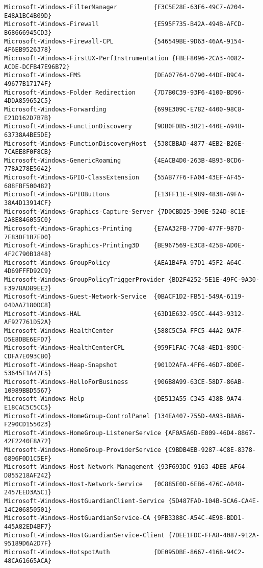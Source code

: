 \documentclass{report}
\begin{document}
\begin{lstlisting}[breaklines=true,basicstyle=\tiny]
Microsoft-Windows-FilterManager          {F3C5E28E-63F6-49C7-A204-E48A1BC4B09D}
Microsoft-Windows-Firewall               {E595F735-B42A-494B-AFCD-B68666945CD3}
Microsoft-Windows-Firewall-CPL           {546549BE-9D63-46AA-9154-4F6EB9526378}
Microsoft-Windows-FirstUX-PerfInstrumentation {FBEF8096-2CA3-4082-ACDE-DCFB47E96B72}
Microsoft-Windows-FMS                    {DEA07764-0790-44DE-B9C4-49677B17174F}
Microsoft-Windows-Folder Redirection     {7D7B0C39-93F6-4100-BD96-4DDA859652C5}
Microsoft-Windows-Forwarding             {699E309C-E782-4400-98C8-E21D162D7B7B}
Microsoft-Windows-FunctionDiscovery      {9DB0FDB5-3B21-440E-A94B-63738A4BE5DE}
Microsoft-Windows-FunctionDiscoveryHost  {538CBBAD-4877-4EB2-B26E-7CAEE8F0F8CB}
Microsoft-Windows-GenericRoaming         {4EACB4D0-263B-4B93-8CD6-778A278E5642}
Microsoft-Windows-GPIO-ClassExtension    {55AB77F6-FA04-43EF-AF45-688FBF500482}
Microsoft-Windows-GPIOButtons            {E13FF11E-E989-4838-A9FA-38A4D13914CF}
Microsoft-Windows-Graphics-Capture-Server {7D0CBD25-390E-524D-8C1E-2A8E846055C0}
Microsoft-Windows-Graphics-Printing      {E7AA32FB-77D0-477F-987D-7E83DF1B7ED0}
Microsoft-Windows-Graphics-Printing3D    {BE967569-E3C8-425B-AD0E-4F2C790B1848}
Microsoft-Windows-GroupPolicy            {AEA1B4FA-97D1-45F2-A64C-4D69FFFD92C9}
Microsoft-Windows-GroupPolicyTriggerProvider {BD2F4252-5E1E-49FC-9A30-F3978AD89EE2}
Microsoft-Windows-Guest-Network-Service  {0BACF1D2-FB51-549A-6119-04DAA7180DC8}
Microsoft-Windows-HAL                    {63D1E632-95CC-4443-9312-AF927761D52A}
Microsoft-Windows-HealthCenter           {588C5C5A-FFC5-44A2-9A7F-D5E8DBE6EFD7}
Microsoft-Windows-HealthCenterCPL        {959F1FAC-7CA8-4ED1-89DC-CDFA7E093CB0}
Microsoft-Windows-Heap-Snapshot          {901D2AFA-4FF6-46D7-8D0E-53645E1A47F5}
Microsoft-Windows-HelloForBusiness       {906B8A99-63CE-58D7-86AB-10989BBD5567}
Microsoft-Windows-Help                   {DE513A55-C345-438B-9A74-E18CAC5C5CC5}
Microsoft-Windows-HomeGroup-ControlPanel {134EA407-755D-4A93-B8A6-F290CD155023}
Microsoft-Windows-HomeGroup-ListenerService {AF0A5A6D-E009-46D4-8867-42F2240F8A72}
Microsoft-Windows-HomeGroup-ProviderService {C9BDB4EB-9287-4C8E-8378-6896F0D1C5EF}
Microsoft-Windows-Host-Network-Management {93F693DC-9163-4DEE-AF64-D855218AF242}
Microsoft-Windows-Host-Network-Service   {0C885E0D-6EB6-476C-A048-2457EED3A5C1}
Microsoft-Windows-HostGuardianClient-Service {5D487FAD-104B-5CA6-CA4E-14C206850501}
Microsoft-Windows-HostGuardianService-CA {9FB3388C-A54C-4E98-BDD1-445A82ED4BF7}
Microsoft-Windows-HostGuardianService-Client {7DEE1FDC-FFA8-4087-912A-95189D6A2D7F}
Microsoft-Windows-HotspotAuth            {DE095DBE-8667-4168-94C2-48CA61665ACA}

\end{lstlisting}
\end{document}
